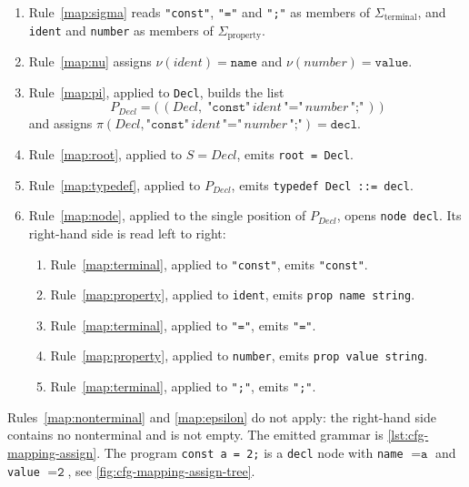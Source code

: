 \documentclass[]{report}
\begin{document}
\begin{enumerate}
  \item Rule~\ref{map:sigma} reads \texttt{"const"}, \texttt{"="} and \texttt{";"} as members of $\Sigma_{\mathrm{terminal}}$, and \texttt{ident} and \texttt{number} as members of $\Sigma_{\mathrm{property}}$.
  \item Rule~\ref{map:nu} assigns $\nu(\mathit{ident}) = \texttt{name}$ and $\nu(\mathit{number}) = \texttt{value}$.
  \item Rule~\ref{map:pi}, applied to \texttt{Decl}, builds the list
    \[
      P_{\mathit{Decl}} = \bigl(\,(\mathit{Decl},\; \texttt{"const"}\,\mathit{ident}\,\texttt{"="}\,\mathit{number}\,\texttt{";"}\,)\,\bigr)
    \]
    and assigns $\pi(\mathit{Decl}, \texttt{"const"}\,\mathit{ident}\,\texttt{"="}\,\mathit{number}\,\texttt{";"}) = \texttt{decl}$.
  \item Rule~\ref{map:root}, applied to $S = \mathit{Decl}$, emits \texttt{root = Decl}.
  \item Rule~\ref{map:typedef}, applied to $P_{\mathit{Decl}}$, emits \texttt{typedef Decl ::= decl}.
  \item Rule~\ref{map:node}, applied to the single position of $P_{\mathit{Decl}}$, opens \texttt{node decl}. Its right-hand side is read left to right:
    \begin{enumerate}
      \item Rule~\ref{map:terminal}, applied to \texttt{"const"}, emits \texttt{"const"}.
      \item Rule~\ref{map:property}, applied to \texttt{ident}, emits \texttt{prop name string}.
      \item Rule~\ref{map:terminal}, applied to \texttt{"="}, emits \texttt{"="}.
      \item Rule~\ref{map:property}, applied to \texttt{number}, emits \texttt{prop value string}.
      \item Rule~\ref{map:terminal}, applied to \texttt{";"}, emits \texttt{";"}.
    \end{enumerate}
\end{enumerate}
\noindent
Rules~\ref{map:nonterminal} and \ref{map:epsilon} do not apply: the right-hand side contains no nonterminal and is not empty. The emitted grammar is \cref{lst:cfg-mapping-assign}. The program \texttt{const a = 2;} is a \texttt{decl} node with \texttt{name} $= \texttt{a}$ and \texttt{value} $= \texttt{2}$, see \cref{fig:cfg-mapping-assign-tree}.
\end{document}
